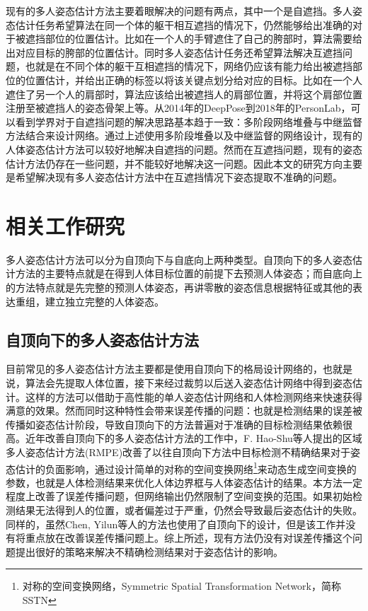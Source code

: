 现有的多人姿态估计方法主要着眼解决的问题有两点，其中一个是自遮挡。多人姿态估计任务希望算法在同一个体的躯干相互遮挡的情况下，仍然能够给出准确的对于被遮挡部位的位置估计。比如在一个人的手臂遮住了自己的胯部时，算法需要给出对应目标的胯部的位置估计。同时多人姿态估计任务还希望算法解决互遮挡问题，也就是在不同个体的躯干互相遮挡的情况下，网络仍应该有能力给出被遮挡部位的位置估计，并给出正确的标签以将该关键点划分给对应的目标。比如在一个人遮住了另一个人的肩部时，算法应该给出被遮挡人的肩部位置，并将这个肩部位置注册至被遮挡人的姿态骨架上等。从2014年的DeepPose\cite{toshev2014deeppose}到2018年的PersonLab\cite{Papandreou2018PersonLab}，可以看到学界对于自遮挡问题的解决思路基本趋于一致：多阶段网络堆叠与中继监督方法结合来设计网络。通过上述使用多阶段堆叠以及中继监督的网络设计，现有的人体姿态估计方法可以较好地解决自遮挡的问题。然而在互遮挡问题，现有的姿态估计方法仍存在一些问题，并不能较好地解决这一问题。因此本文的研究方向主要是希望解决现有多人姿态估计方法中在互遮挡情况下姿态提取不准确的问题。

\section{相关工作研究}
\label{sec:related_work}
多人姿态估计方法可以分为自顶向下与自底向上两种类型。自顶向下的多人姿态估计方法的主要特点就是在得到人体目标位置的前提下去预测人体姿态；而自底向上的方法特点就是先完整的预测人体姿态，再讲零散的姿态信息根据特征或其他的表达重组，建立独立完整的人体姿态。

\subsection{自顶向下的多人姿态估计方法}
\label{subsec:topdown}
目前常见的多人姿态估计方法主要都是使用自顶向下的格局设计网络的，也就是说，算法会先提取人体位置，接下来经过裁剪以后送入姿态估计网络中得到姿态估计。这样的方法可以借助于高性能的单人姿态估计网络和人体检测网络来快速获得满意的效果。然而同时这种特性会带来误差传播的问题：也就是检测结果的误差被传播如姿态估计阶段，导致自顶向下的方法普遍对于准确的目标检测结果依赖很高。近年改善自顶向下的多人姿态估计方法的工作中，F. Hao-Shu\cite{fang2017rmpe}等人提出的区域多人姿态估计方法(RMPE)改善了以往自顶向下方法中目标检测不精确结果对于姿态估计的负面影响，通过设计简单的对称的空间变换网络\footnote{对称的空间变换网络，Symmetric Spatial Transformation Network，简称SSTN}来动态生成空间变换的参数，也就是人体检测结果来优化人体边界框与人体姿态估计的结果。本方法一定程度上改善了误差传播问题，但网络输出仍然限制了空间变换的范围。如果初始检测结果无法得到人的位置，或者偏差过于严重，仍然会导致最后姿态估计的失败。同样的，虽然Chen, Yilun等人的方法\cite{Chen2017Cascaded}也使用了自顶向下的设计，但是该工作并没有将重点放在改善误差传播问题上。综上所述，现有方法仍没有对误差传播这个问题提出很好的策略来解决不精确检测结果对于姿态估计的影响。

